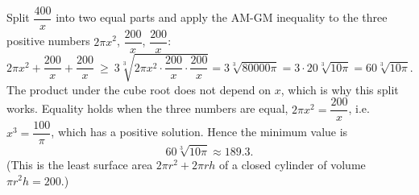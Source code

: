 Split $\dfrac{400}{x}$ into two equal parts and apply the AM-GM inequality to the three positive numbers $2\pi x^2$, $\dfrac{200}{x}$, $\dfrac{200}{x}$:
\[
2\pi x^2+\dfrac{200}{x}+\dfrac{200}{x}\ \ge\ 3\sqrt[3]{2\pi x^2\cdot\dfrac{200}{x}\cdot\dfrac{200}{x}}=3\sqrt[3]{80000\pi}=3\cdot20\sqrt[3]{10\pi}=60\sqrt[3]{10\pi}.
\]
The product under the cube root does not depend on $x$, which is why this split works. Equality holds when the three numbers are equal, $2\pi x^2=\dfrac{200}{x}$, i.e. $x^3=\dfrac{100}{\pi}$, which has a positive solution. Hence the minimum value is
\[
\boxed{60\sqrt[3]{10\pi}}\approx 189.3 .
\]
(This is the least surface area $2\pi r^2+2\pi rh$ of a closed cylinder of volume $\pi r^2h=200$.)

